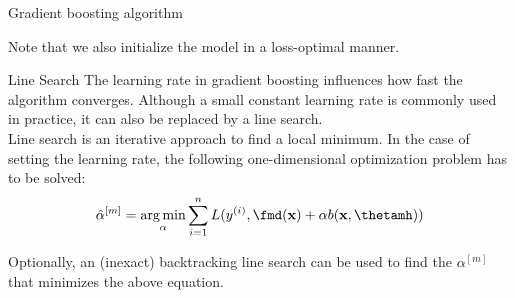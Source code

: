 \documentclass[11pt,compress,t,notes=noshow, xcolor=table]{beamer}
\begin{document}

\begin{vbframe}{Gradient boosting algorithm}



Note that we also initialize the model in a loss-optimal manner. %

\end{vbframe}

\begin{vbframe}{Line Search}
The learning rate in gradient boosting influences how fast the algorithm converges. 
Although a small constant learning rate is commonly used in practice, it can also be replaced by a line search.\\\lz
Line search is an iterative approach to find a local minimum. In the case of setting the learning rate, the following one-dimensional optimization problem has to be solved:
$$\hat{\alpha}^{[m]} = \argmin_{\alpha} \sumin L(\yi, \fmd(\xv) + \alpha b(\xv, \thetamh))$$

Optionally, an (inexact) backtracking line search can be used to find the 
$\alpha^{[m]}$ that minimizes the above equation.

\end{vbframe}

\endlecture
\end{document}
